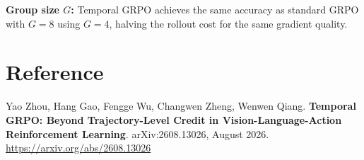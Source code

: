 \documentclass[10pt,twocolumn]{article}
\begin{document}
\textbf{Group size $G$:} Temporal GRPO achieves the same accuracy as standard
GRPO with $G=8$ using $G=4$, halving the rollout cost for the same gradient quality.

\section*{Reference}

Yao Zhou, Hang Gao, Fengge Wu, Changwen Zheng, Wenwen Qiang.
\textbf{Temporal GRPO: Beyond Trajectory-Level Credit in Vision-Language-Action
Reinforcement Learning}.
arXiv:2608.13026, August 2026.
\url{https://arxiv.org/abs/2608.13026}
\end{document}
